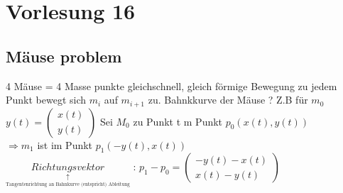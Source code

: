 \section{Vorlesung 16}
\subsection{Mäuse problem}
\begin{flushleft}
	4 Mäuse = 4 Masse punkte 
gleichschnell, gleich förmige Bewegung zu jedem Punkt bewegt sich $m_i$ auf $m_{i+1}$ zu.
Bahnkkurve der Mäuse ? Z.B für $m_0$\\
$y(t)= \begin{pmatrix}
x(t)\\
y(t)
\end{pmatrix}$
Sei $M_0$ zu Punkt t m Punkt $p_0(x(t),y(t))$\\
 $\Rightarrow m_1$ ist im Punkt $p_1 (-y(t),x(t))$\\
$\underset{\underset{\text{Tangentenrichtung an Bahnkurve (entspricht) Ableitung} }{\uparrow}}{Richtungsvektor}$  : $p_1 - p_0 = \begin{pmatrix}
 									-y(t) - x(t)\\
									 x(t)-y(t)
								\end{pmatrix}$\\
								

\end{flushleft}
